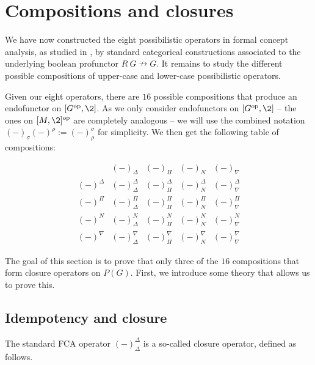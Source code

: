 \section{Compositions and closures}

We have now constructed the eight possibilistic operators in formal concept analysis, as studied in \cite{dubois-dupin-prade_2007, dubois-prade_2009}, by standard categorical constructions associated to the underlying boolean profunctor $R\: G \nrightarrow G$. It remains to study the different possible compositions of upper-case and lower-case possibilistic operators. 

Given our eight operators, there are $16$ possible compositions that produce an endofunctor on $[G\op, \2]$. As we only consider endofunctors on $[G\op, \2]$ -- the ones on $[M,\2]\op$ are completely analogous -- we will use the combined notation $(-)_\sigma (-)^\rho := (-)^\sigma_\rho$ for simplicity. We then get the following table of compositions:

\begin{table}[ht]
\centering
\[
\begin{array}{c|cccc}
 & (-)_\Delta & (-)_\Pi & (-)_N & (-)_\nabla \\ \hline
(-)^\Delta
    & (-)^\Delta_\Delta
    & (-)^\Delta_\Pi
    & (-)^\Delta_N
    & (-)^\Delta_\nabla \\[0.4em]
(-)^\Pi
    & (-)^\Pi_\Delta
    & (-)^\Pi_\Pi
    & (-)^\Pi_N
    & (-)^\Pi_\nabla \\[0.4em]
(-)^N
    & (-)^N_\Delta
    & (-)^N_\Pi
    & (-)^N_N
    & (-)^N_\nabla \\[0.4em]
(-)^\nabla
    & (-)^\nabla_\Delta
    & (-)^\nabla_\Pi
    & (-)^\nabla_N
    & (-)^\nabla_\nabla
\end{array}
\]
\caption{The sixteen possible binary compositions.}
\label{tab:possibilistic-compositions}
\end{table}

The goal of this section is to prove that only three of the $16$ compositions that form closure operators on $P(G)$. First, we introduce some theory that allows us to prove this. 

\subsection{Idempotency and closure}

The standard FCA operator $(-)^\Delta_\Delta$ is a so-called closure operator, defined as follows. 

